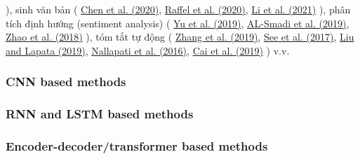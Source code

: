 ), sinh văn bản (
\href{https://www.sciencedirect.com/science/article/pii/S2667305323000698#br0240}{Chen et al. (2020)},
\href{https://www.sciencedirect.com/science/article/pii/S2667305323000698#br1120}{Raffel et al. (2020)},
\href{https://www.sciencedirect.com/science/article/pii/S2667305323000698#br0710}{Li et al. (2021)}
),
phân tích định hướng (sentiment analysis) (
\href{https://www.sciencedirect.com/science/article/pii/S2667305323000698#br1510}{Yu et al. (2019)},
\href{https://www.sciencedirect.com/science/article/pii/S2667305323000698#br0020}{AL-Smadi et al. (2019)},
\href{https://www.sciencedirect.com/science/article/pii/S2667305323000698#br1640}{Zhao et al. (2018)}
), tóm tắt tự động (
\href{https://www.sciencedirect.com/science/article/pii/S2667305323000698#br1600}{Zhang et al. (2019)},
\href{https://www.sciencedirect.com/science/article/pii/S2667305323000698#br1230}{See et al. (2017)},
\href{https://www.sciencedirect.com/science/article/pii/S2667305323000698#br0770}{Liu and Lapata (2019)},
\href{https://www.sciencedirect.com/science/article/pii/S2667305323000698#br0970}{Nallapati et al. (2016)},
\href{https://www.sciencedirect.com/science/article/pii/S2667305323000698#br0180}{Cai et al. (2019)}
) v.v.

\subsubsection{CNN based methods}
\subsubsection{RNN and LSTM based methods}
\subsubsection{Encoder-decoder/transformer based methods}
